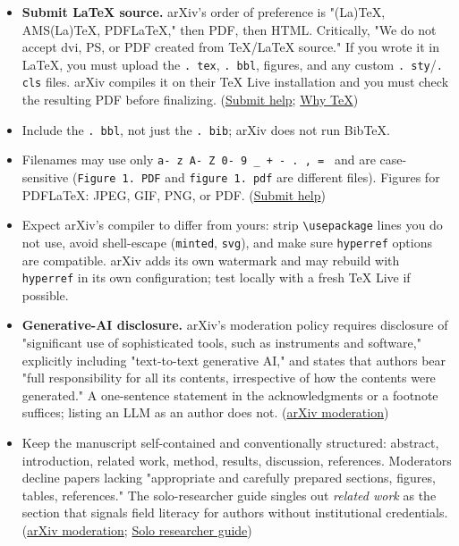 \documentclass[twocolumn,10pt,letterpaper]{article}
\begin{document}
\begin{itemize}
\setlength{\itemsep}{0pt}
\setlength{\parskip}{0pt}
  \item \textbf{Submit LaTeX source.} arXiv's order of preference is "(La)TeX, AMS(La)TeX, PDFLaTeX," then PDF, then HTML. Critically, "We do not accept dvi, PS, or PDF created from TeX/LaTeX source." If you wrote it in LaTeX, you must upload the \texttt{. tex}, \texttt{. bbl}, figures, and any custom \texttt{. sty}/\texttt{. cls} files. arXiv compiles it on their TeX Live installation and you must check the resulting PDF before finalizing. (\href{https://info.arxiv.org/help/submit/index.html}{Submit help}; \href{https://info.arxiv.org/help/faq/whytex.html}{Why TeX})
  \item Include the \texttt{. bbl}, not just the \texttt{. bib}; arXiv does not run BibTeX.
  \item Filenames may use only \texttt{a- z A- Z 0- 9 \_  + -  .  ,  = } and are case-sensitive (\texttt{Figure 1. PDF} and \texttt{figure 1. pdf} are different files). Figures for PDFLaTeX: JPEG, GIF, PNG, or PDF. (\href{https://info.arxiv.org/help/submit/index.html}{Submit help})
  \item Expect arXiv's compiler to differ from yours: strip \texttt{\textbackslash{}usepackage} lines you do not use, avoid shell-escape (\texttt{minted}, \texttt{svg}), and make sure \texttt{hyperref} options are compatible. arXiv adds its own watermark and may rebuild with \texttt{hyperref} in its own configuration; test locally with a fresh TeX Live if possible.
  \item \textbf{Generative-AI disclosure.} arXiv's moderation policy requires disclosure of "significant use of sophisticated tools, such as instruments and software," explicitly including "text-to-text generative AI," and states that authors bear "full responsibility for all its contents, irrespective of how the contents were generated." A one-sentence statement in the acknowledgments or a footnote suffices; listing an LLM as an author does not. (\href{https://info.arxiv.org/help/moderation/index.html}{arXiv moderation})
  \item Keep the manuscript self-contained and conventionally structured: abstract, introduction, related work, method, results, discussion, references. Moderators decline papers lacking "appropriate and carefully prepared sections, figures, tables, references." The solo-researcher guide singles out \textit{related work} as the section that signals field literacy for authors without institutional credentials. (\href{https://info.arxiv.org/help/moderation/index.html}{arXiv moderation}; \href{https://learnedgeek.com/Blog/Post/solo-researcher-guide-arxiv}{Solo researcher guide})
\end{itemize}
\end{document}
